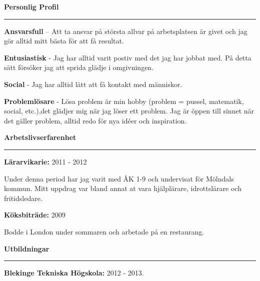 \documentclass[12pt , a4paper]{article}
\begin{document}
	\begin{flushleft}
	
		\vspace{24pt}
		\vspace{24pt}
		{\large \textbf{Personlig Profil}}
		\hrule		
		
		\vspace{12pt}
		\textbf{Ansvarsfull} – Att ta ansvar på största allvar på arbetsplatsen är givet och jag gör alltid mitt bästa för att få resultat.

			\vspace{3 pt}
	    	\textbf{Entusiastisk} - Jag har alltid varit postiv med det jag har jobbat med.
	    	På detta sätt försöker jag att sprida glädje i omgivningen.
	    	
	    	
			\vspace{3 pt}
 		    \textbf{Social} - Jag har alltid lätt att få kontakt med människor.	
			
			
			\vspace{3 pt}
 		    \textbf{Problemlösare} - Lösa problem är min hobby (problem = pussel, matematik, social, etc.),det glädjer mig när jag löser ett problem. Jag är öppen till sinnet när det gäller problem, alltid redo för nya idéer och inspiration. 
		
		\vspace{12pt}		
		{\large \textbf{Arbetslivserfarenhet}}
		\hrule
		\vspace{6pt}
				
		\textbf{Lärarvikarie: } 2011 - 2012	
		
		Under denna period har jag varit med ÅK 1-9 och undervisat för Mölndals kommun.
		Mitt uppdrag var bland annat at vara hjälplärare, idrottslärare och fritidsledare.
		
		\vspace{6pt}
		\textbf{Köksbiträde: } 2009
		
		Bodde i London under sommaren och arbetade på en restaurang. 
		
		\vspace{12pt}
		{\large \textbf{Utbildningar}}
		\hrule
		
		
		\vspace{6pt}
		
		 \textbf{Blekinge Tekniska Högskola: } 2012 - 2013. 
		

\end{flushleft}
\end{document}
